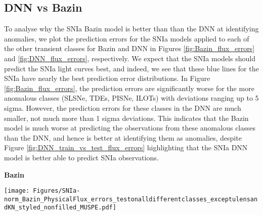 \documentclass[fleqn,usenatbib]{mnras}
\begin{document}
    \subsection{DNN vs Bazin}
        \label{sec:Appendix_DNN_vs_Bazin}
        To analyse why the SNIa Bazin model is better than than the DNN at identifying anomalies, we plot the prediction errors for the SNIa models applied to each of the other transient classes for Bazin and DNN in Figures \ref{fig:Bazin_flux_errors} and \ref{fig:DNN_flux_errors}, respectively. We expect that the SNIa models should predict the SNIa light curves best, and indeed, we see that these blue lines for the SNIa have nearly the best prediction error distributions. In Figure \ref{fig:Bazin_flux_errors}, the prediction errors are significantly worse for the more anomalous classes (SLSNe, TDEs, PISNe, ILOTs) with deviations ranging up to 5 sigma. However, the prediction errors for these classes in the DNN are much smaller, not much more than 1 sigma deviations. This indicates that the Bazin model is much worse at predicting the observations from these anomalous classes than the DNN, and hence is better at identifying them as anomalies, despite Figure \ref{fig:DNN_train_vs_test_flux_errors} highlighting that the SNIa DNN model is better able to predict SNIa observations.
        \begin{figure*}
        \centering
        \textbf{Bazin}\par\medskip
        \vspace{-0.8em}
        \texttt{[image: Figures/SNIa-norm\_Bazin\_PhysicalFlux\_errors\_testonalldifferentclasses\_exceptulensandKN\_styled\_nonfilled\_MUSPE.pdf]}
        \caption[Distribution of the Measurement-Uncertainty-Scaled Prediction Errors (MUSPE) for the Bazin SNIa model at different times.]{Distribution of the Measurement-Uncertainty-Scaled Prediction Errors (MUSPE) for the Bazin SNIa model at different times. We apply the Bazin SNIa model to each other class' datasets and compute Equation \ref{eq:physical_flux_error} at each time-step. We have not plotted the kilonova or uLens-BSR classes here because they show significant deviations, indicating that the SNIa model is very bad at predicting these classes, and hence easily identifies them as anomalies. We show the mean and root mean square (rms) for each prediction error distribution at each time-step in the first three panels, with the $g$ band shown in the top row of panels, and the $r$ band shown in the bottom row of panels. In the last column, we plot the distribution of scaled errors across all times. Similar plots were made for the SNIbc, SNII, kilonova, SLSN and TDE Bazin models, but are not shown here for brevity. We plot a unit Gaussian as a black dashed line to help guide the eye. The plots were made using the simulated dataset.}
        \label{fig:Bazin_flux_errors}
        \end{figure*}
        
\end{document}
